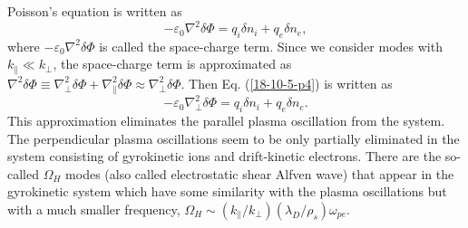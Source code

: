 \documentclass{article}
\begin{document}
Poisson's equation is written as
\begin{equation}
  \label{18-10-5-p4} - \varepsilon_0 \nabla^2 \delta \Phi = q_i \delta n_i +
  q_e \delta n_e,
\end{equation}
where $- \varepsilon_0 \nabla^2 \delta \Phi$ is called the space-charge term.
Since we consider modes with $k_{\parallel} \ll k_{\perp}$, the space-charge
term is approximated as $\nabla^2 \delta \Phi \equiv \nabla^2_{\perp} \delta
\Phi + \nabla^2_{\parallel} \delta \Phi \approx \nabla^2_{\perp} \delta \Phi$.
Then Eq. (\ref{18-10-5-p4}) is written as
\begin{equation}
  \label{19-1-12-e2} - \varepsilon_0 \nabla^2_{\perp} \delta \Phi = q_i \delta
  n_i + q_e \delta n_e .
\end{equation}
This approximation eliminates the parallel plasma oscillation from the system.
The perpendicular plasma oscillations seem to be only partially eliminated in
the system consisting of gyrokinetic ions and drift-kinetic electrons. There
are the so-called $\Omega_H$ modes (also called electrostatic shear Alfven
wave) that appear in the gyrokinetic system which have some similarity with
the plasma oscillations but with a much smaller frequency, $\Omega_H \sim
(k_{\parallel} / k_{\perp}) (\lambda_D / \rho_s) \omega_{p e}$.
\end{document}
